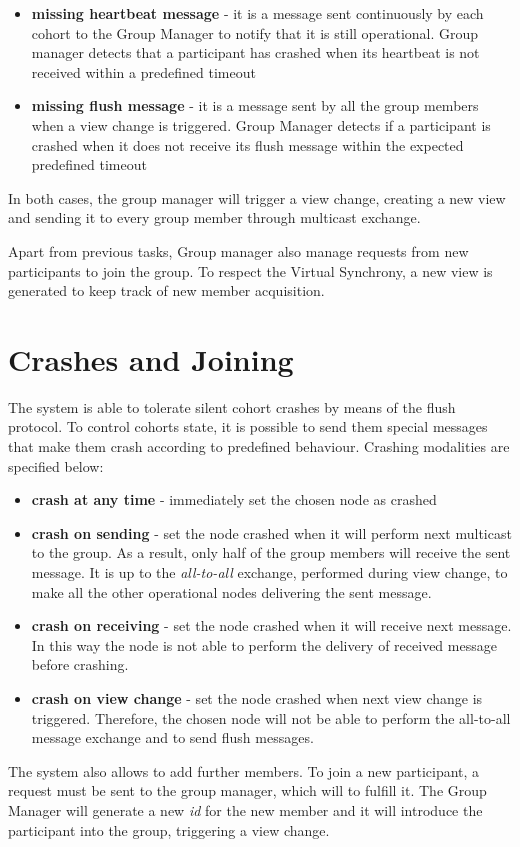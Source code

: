 \documentclass[11pt]{article}
\begin{document}
	\begin{itemize}
		\item \textbf{missing heartbeat message} - it is a message sent continuously by each cohort to the Group Manager to notify that it is still operational. Group manager detects that a participant has crashed when its heartbeat is not received within a predefined timeout
		\item \textbf{missing flush message} - it is a message sent by all the group members when a view change is triggered. Group Manager detects if a participant is crashed when it does not receive its flush message within the expected predefined timeout
	\end{itemize}
	In both cases, the group manager will trigger a view change, creating a new view and sending it to every group member through multicast exchange.
	
	Apart from previous tasks, Group manager also manage requests from new participants to join the group. To respect the Virtual Synchrony, a new view is generated to keep track of new member acquisition.
	
	
	\section{Crashes and Joining}
	The system is able to tolerate silent cohort crashes by means of the flush protocol. To control cohorts state, it is possible to send them special messages that make them crash according to predefined behaviour. Crashing modalities are specified below:
	
	\begin{itemize}
		\item \textbf{crash at any time} - immediately set the chosen node as crashed
		\item \textbf{crash on sending} - set the node crashed when it will perform next multicast to the group. As a result, only half of the group members will receive the sent message. It is up to the \textit{all-to-all} exchange, performed during view change, to make all the other operational nodes delivering the sent message.
		\item \textbf{crash on receiving} - set the node crashed when it will receive next message. In this way the node is not able to perform the delivery of received message before crashing.
		\item \textbf{crash on view change} - set the node crashed when next view change is triggered. Therefore, the chosen node will not be able to perform the all-to-all message exchange and to send flush messages.
	\end{itemize}
	
	The system also allows to add further members. To join a new participant, a request must be sent to the group manager, which will to fulfill it. The Group Manager will generate a new \textit{id} for the new member and it will introduce the participant into the group, triggering a view change.
		
\end{document}
